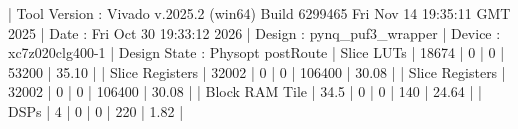 \begin{codeblock}
| Tool Version : Vivado v.2025.2 (win64) Build 6299465 Fri Nov 14 19:35:11 GMT 2025
| Date         : Fri Oct 30 19:33:12 2026
| Design       : pynq_puf3_wrapper
| Device       : xc7z020clg400-1
| Design State : Physopt postRoute
| Slice LUTs                 | 18674 |     0 |          0 |     53200 | 35.10 |
| Slice Registers            | 32002 |     0 |          0 |    106400 | 30.08 |
| Slice Registers                            | 32002 |     0 |          0 |    106400 | 30.08 |
| Block RAM Tile    | 34.5 |     0 |          0 |       140 | 24.64 |
| DSPs           |    4 |     0 |          0 |       220 |  1.82 |
\end{codeblock}
